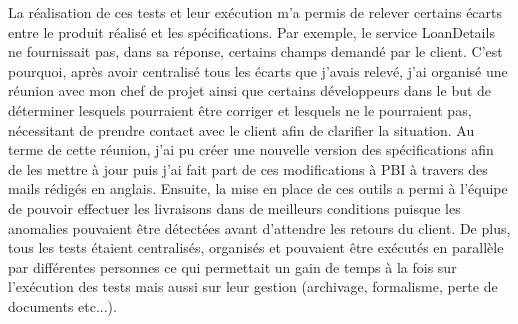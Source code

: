 	La réalisation de ces tests et leur exécution m'a permis de relever certains écarts entre le produit réalisé et les spécifications. Par exemple, le service LoanDetails ne fournissait pas, dans sa réponse, certains champs demandé par le client. C'est pourquoi, après avoir centralisé tous les écarts que j'avais relevé, j'ai organisé une réunion avec mon chef de projet ainsi que certains développeurs dans le but de déterminer lesquels pourraient être corriger et lesquels ne le pourraient pas, nécessitant de prendre contact avec le client afin de clarifier la situation. Au terme de cette réunion, j'ai pu créer une nouvelle version des spécifications afin de les mettre à jour puis j'ai fait part de ces modifications à PBI à travers des mails rédigés en anglais. Ensuite, la mise en place de ces outils a permi à l'équipe de pouvoir effectuer les livraisons dans de meilleurs conditions puisque les anomalies pouvaient être détectées avant d'attendre les retours du client. De plus, tous les tests étaient centralisés, organisés et pouvaient être exécutés en parallèle par différentes personnes ce qui permettait un gain de temps à la fois sur l'exécution des tests mais aussi sur leur gestion (archivage, formalisme, perte de documents etc...). \\
	

